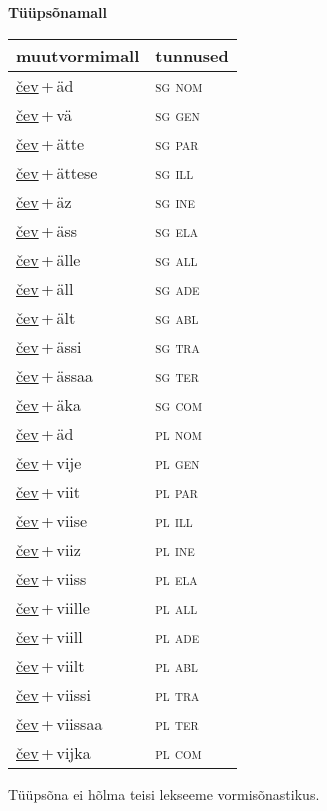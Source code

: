 
\vspace{1.8em}
\begin{minipage}{\textwidth}
\textbf{Tüüpsõnamall \,}\\

\begin{sideways}
\begin{tabular}{l l}
muutvormimall & tunnused \\
\hline
\underline{čev}\,+\,äd & \textsc{ sg nom } \\
\underline{čev}\,+\,vä & \textsc{ sg gen } \\
\underline{čev}\,+\,ätte & \textsc{ sg par } \\
\underline{čev}\,+\,ättese & \textsc{ sg ill } \\
\underline{čev}\,+\,äz & \textsc{ sg ine } \\
\underline{čev}\,+\,äss & \textsc{ sg ela } \\
\underline{čev}\,+\,älle & \textsc{ sg all } \\
\underline{čev}\,+\,äll & \textsc{ sg ade } \\
\underline{čev}\,+\,ält & \textsc{ sg abl } \\
\underline{čev}\,+\,ässi & \textsc{ sg tra } \\
\underline{čev}\,+\,ässaa & \textsc{ sg ter } \\
\underline{čev}\,+\,äka & \textsc{ sg com } \\
\underline{čev}\,+\,äd & \textsc{ pl nom } \\
\underline{čev}\,+\,vije & \textsc{ pl gen } \\
\underline{čev}\,+\,viit & \textsc{ pl par } \\
\underline{čev}\,+\,viise & \textsc{ pl ill } \\
\underline{čev}\,+\,viiz & \textsc{ pl ine } \\
\underline{čev}\,+\,viiss & \textsc{ pl ela } \\
\underline{čev}\,+\,viille & \textsc{ pl all } \\
\underline{čev}\,+\,viill & \textsc{ pl ade } \\
\underline{čev}\,+\,viilt & \textsc{ pl abl } \\
\underline{čev}\,+\,viissi & \textsc{ pl tra } \\
\underline{čev}\,+\,viissaa & \textsc{ pl ter } \\
\underline{čev}\,+\,vijka & \textsc{ pl com } \\
\end{tabular}
\end{sideways}
\label{tab:tüüpsõnamall-čeväd}

\end{minipage}

 
\vspace{1em}
\noindent Tüüpsõna ei hõlma teisi lekseeme vormi\-sõnastikus.
